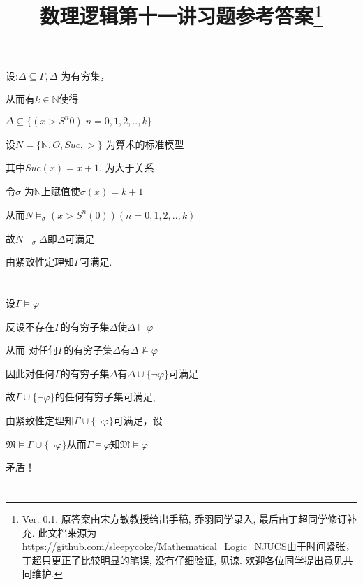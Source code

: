 \documentclass{article}
\begin{document}
\title{数理逻辑第十一讲习题参考答案\footnote{Ver. 0.1. 原答案由宋方敏教授给出手稿, 乔羽同学录入, 最后由丁超同学修订补充. 此文档来源为\url{https://github.com/sleepycoke/Mathematical_Logic_NJUCS}由于时间紧张，丁超只更正了比较明显的笔误, 没有仔细验证, 见谅. 
 欢迎各位同学提出意见共同维护. 
}}
\maketitle

\section{}

设:$\Delta \subseteq \Gamma, \Delta$ 为有穷集，

从而有$k \in \mathbb{N} $使得

$\Delta \subseteq \{ (x > S^n0) | n=0,1,2,..,k\}$

设$N = \{ \mathbb{N},O,Suc , >  \}$ 为算术的标准模型

其中$ Suc (x) =x+1 $, $ $为大于关系

令$\sigma$ 为$\mathbb{N}$上赋值使$\sigma (x) = k+1$

从而$N \vDash_\sigma (x>S^n(0))(n=0,1,2,..,k)$

故$N \vDash_\sigma \Delta$即$\Delta$可满足

由紧致性定理知$\Gamma$可满足.

\section{}


设$\Gamma \vDash \varphi$

反设不存在$\Gamma$的有穷子集$\Delta$使$\Delta \vDash \varphi$

从而 对任何$\Gamma$的有穷子集$\Delta$有$\Delta \nvDash \varphi$

因此对任何$\Gamma$的有穷子集$\Delta$有$\Delta \cup \{\neg \varphi\}$可满足

故$\Gamma \cup \{\neg \varphi\}$的任何有穷子集可满足,

由紧致性定理知$\Gamma \cup \{\neg \varphi\}$可满足，设

$\mathfrak{M} \vDash \Gamma \cup\{\neg \varphi\}$从而$\Gamma \vDash \varphi$知$\mathfrak{M} \vDash \varphi$

矛盾！

\section{}
\end{document}
